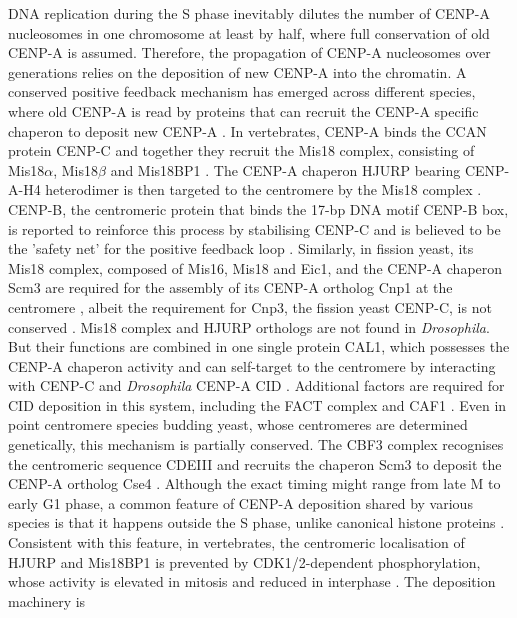 DNA replication during the S phase inevitably dilutes the number of CENP-A nucleosomes in one chromosome at least by half, where full conservation of old CENP-A is assumed. Therefore, the propagation of CENP-A nucleosomes over generations relies on the deposition of new CENP-A into the chromatin. A conserved positive feedback mechanism has emerged across different species, where old CENP-A is read by proteins that can recruit the CENP-A specific chaperon to deposit new CENP-A \citep{Stirpe2022, McKinley2015}. In vertebrates, CENP-A binds the CCAN protein CENP-C and together they recruit the Mis18 complex, consisting of Mis18$\alpha$, Mis18$\beta$ and Mis18BP1 \citep{Westhorpe2015AMaintenance, Moree2011CENP-CAssembly, Dambacher2012CENP-CChromatin, French2017XenopusAssembly, Wang2014MitoticHJURP, Pan2019MechanismLicensing}. The CENP-A chaperon HJURP bearing CENP-A-H4 heterodimer is then targeted to the centromere by the Mis18 complex \citep{Foltz2009, Dunleavy2009}. CENP-B, the centromeric protein that binds the 17-bp DNA motif CENP-B box, is reported to reinforce this process by stabilising CENP-C \citep{Fachinetti2015, Hoffmann2020, Chardon2022CENP-B-mediatedCentromeres, Masumoto1989ASatellite., Suzuki2004CENP-BLocalization} and is believed to be the 'safety net' for the positive feedback loop \citep{Berg2020}. Similarly, in fission yeast, its Mis18 complex, composed of Mis16, Mis18 and Eic1, and the CENP-A chaperon Scm3 are required for the assembly of its CENP-A ortholog Cnp1 at the centromere \citep{Pidoux2009FissionChromatin, Hayashi2004Mis16Centromeres, Williams2009FissionChromatin}, albeit the requirement for Cnp3, the fission yeast CENP-C, is not conserved \citep{Subramanian2014Eic1Assembly}. Mis18 complex and HJURP orthologs are not found in \textit{Drosophila}. But their functions are combined in one single protein CAL1, which possesses the CENP-A chaperon activity and can self-target to the centromere by interacting with CENP-C and \textit{Drosophila} CENP-A CID \citep{Chen2014, MedinaPritchard2020, Phansalkar2012EvolutionaryDrosophila, Roure2019, Schittenhelm2010}. Additional factors are required for CID deposition in this system, including the FACT complex \citep{Chen2015EstablishmentTranscription} and CAF1 \citep{Furuyama2006Chaperone-mediatedVitro, Boltengagen2016AMelanogaster}. Even in point centromere species budding yeast, whose centromeres are determined genetically, this mechanism is partially conserved. The CBF3 complex recognises the centromeric sequence CDEIII and recruits the chaperon Scm3 to deposit the CENP-A ortholog Cse4 \citep{Camahort2007Scm3Kinetochore, Guan2021StructuralFormation, Cho2011Ndc10Yeast, Mizuguchi2007NonhistoneNucleosomes, Zhou2011StructuralScm3, Meluh1998Cse4pCerevisiae}. Although the exact timing might range from late M to early G1 phase, a common feature of CENP-A deposition shared by various species is that it happens outside the S phase, unlike canonical histone proteins \citep{Fukagawa2014, McKinley2015TheFunction, Stirpe2022}. Consistent with this feature, in vertebrates, the centromeric localisation of HJURP and Mis18BP1 is prevented by CDK1/2-dependent phosphorylation, whose activity is elevated in mitosis and reduced in interphase \citep{Silva2012, Spiller2017MolecularDeposition, Stankovic2017}. The deposition machinery is 
